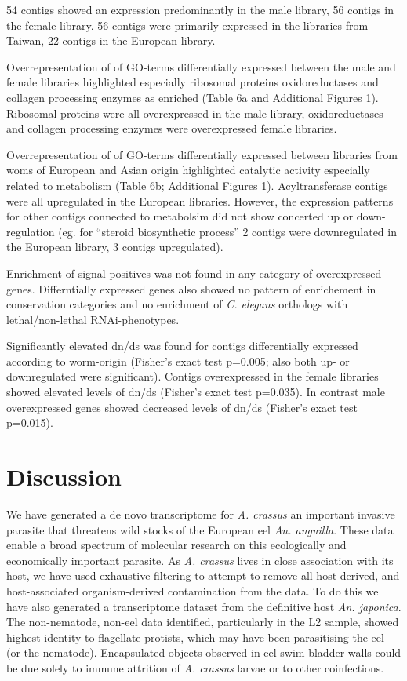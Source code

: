 \documentclass[10pt]{bmc_article}
\newenvironment{bmcformat}{\begin{raggedright}\baselineskip20pt\sloppy\setboolean{publ}{false}}{\end{raggedright}\baselineskip20pt\sloppy}
\begin{document}
\begin{bmcformat}
54 contigs
showed an expression predominantly in the male library,
56 contigs
in the female
library. 56
contigs were primarily expressed in the libraries from Taiwan,
22 contigs
in the European library.

Overrepresentation of of GO-terms differentially expressed between the
male and female libraries highlighted especially ribosomal proteins
oxidoreductases and collagen processing enzymes as enriched (Table 6a
and Additional Figures 1). Ribosomal proteins were all overexpressed
in the male library, oxidoreductases and collagen processing enzymes
were overexpressed female libraries.

Overrepresentation of of GO-terms differentially expressed between
libraries from woms of European and Asian origin highlighted catalytic
activity especially related to metabolism (Table 6b; Additional
Figures 1). Acyltransferase contigs were all upregulated in the
European libraries. However, the expression patterns for other contigs
connected to metabolsim did not show concerted up or down-regulation
(eg. for ``steroid biosynthetic process'' 2 contigs were downregulated
in the European library, 3 contigs upregulated).

Enrichment of signal-positives was not found in any category of
overexpressed genes. Differntially expressed genes also showed no
pattern of enrichement in conservation categories and no enrichment of
\textit{C. elegans} orthologs with lethal/non-lethal RNAi-phenotypes.

Significantly elevated dn/ds was found for contigs differentially
expressed according to worm-origin (Fisher's exact test
p=0.005; also both up- or
downregulated were significant). Contigs overexpressed in the female
libraries showed elevated levels of dn/ds (Fisher's exact test
p=0.035). In contrast male
overexpressed genes showed decreased levels of dn/ds (Fisher's exact
test p=0.015).


\section*{Discussion}

We have generated a de novo transcriptome for \textit{A. crassus} an
important invasive parasite that threatens wild stocks of the European
eel \textit{An. anguilla}. These data enable a broad spectrum of
molecular research on this ecologically and economically important
parasite. As \textit{A. crassus} lives in close association with its
host, we have used exhaustive filtering to attempt to remove all
host-derived, and host-associated organism-derived contamination from
the data. To do this we have also generated a transcriptome dataset
from the definitive host \textit{An. japonica}. The non-nematode,
non-eel data identified, particularly in the L2 sample, showed highest
identity to flagellate protists, which may have been parasitising the
eel (or the nematode). Encapsulated objects observed in eel swim
bladder walls \cite{heitlinger_massive_2009} could be due solely to
immune attrition of \textit{A. crassus} larvae or to other
coinfections.


\end{bmcformat}
\end{document}
